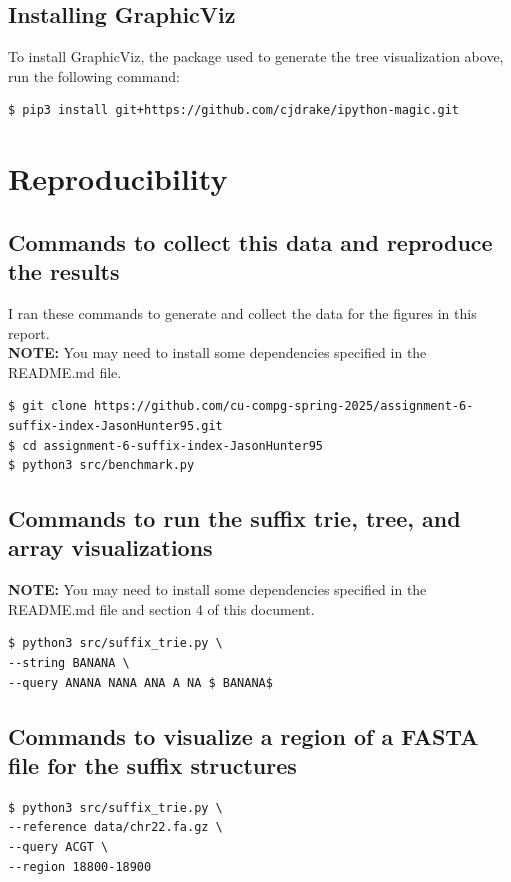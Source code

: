 \documentclass[11pt, letterpaper]{article}
\begin{document}
\subsection{Installing GraphicViz}
To install GraphicViz, the package used to generate the tree visualization above, run the following command:
\begin{verbatim}
$ pip3 install git+https://github.com/cjdrake/ipython-magic.git
\end{verbatim}

\newpage

\section{Reproducibility}
\subsection{Commands to collect this data and reproduce the results}
I ran these commands to generate and collect the data for the figures in this report. \\
\textbf{NOTE:} You may need to install some dependencies specified in the README.md file.
\begin{verbatim}
$ git clone https://github.com/cu-compg-spring-2025/assignment-6-suffix-index-JasonHunter95.git
$ cd assignment-6-suffix-index-JasonHunter95
$ python3 src/benchmark.py
\end{verbatim}

\subsection{Commands to run the suffix trie, tree, and array visualizations}
\textbf{NOTE:} You may need to install some dependencies specified in the README.md file and section 4 of this document. \
\begin{verbatim}
$ python3 src/suffix_trie.py \
--string BANANA \
--query ANANA NANA ANA A NA $ BANANA$
\end{verbatim}

\subsection{Commands to visualize a region of a FASTA file for the suffix structures}
\begin{verbatim}
$ python3 src/suffix_trie.py \
--reference data/chr22.fa.gz \
--query ACGT \
--region 18800-18900
\end{verbatim}
\end{document}
